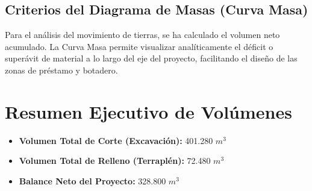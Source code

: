 \documentclass[11pt,letterpaper]{article}
\begin{document}
\subsection{Criterios del Diagrama de Masas (Curva Masa)}
Para el análisis del movimiento de tierras, se ha calculado el volumen neto acumulado. La Curva Masa permite visualizar analíticamente el déficit o superávit de material a lo largo del eje del proyecto, facilitando el diseño de las zonas de préstamo y botadero.
\section{Resumen Ejecutivo de Volúmenes}
\begin{itemize}
  \item \textbf{Volumen Total de Corte (Excavación):} 401.280 $m^3$
  \item \textbf{Volumen Total de Relleno (Terraplén):} 72.480 $m^3$
  \item \textbf{Balance Neto del Proyecto:} 328.800 $m^3$
\end{itemize}
\end{document}
